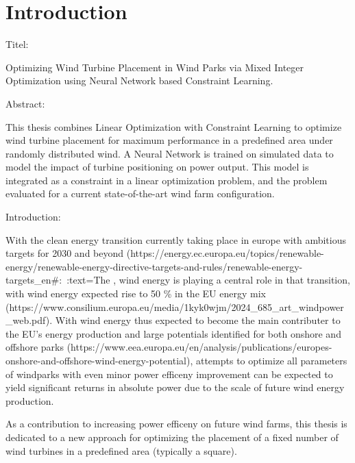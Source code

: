
\chapter{Introduction}\label{chapter:introduction}

Titel:

Optimizing Wind Turbine Placement in Wind Parks via Mixed Integer Optimization using Neural Network based Constraint Learning.


Abstract: 

This thesis combines Linear Optimization with Constraint Learning to optimize wind turbine placement for maximum performance in a predefined area under randomly distributed wind. A Neural Network is trained on simulated data to model the impact of turbine positioning on power output. This model is integrated as a constraint in a linear optimization problem, and the problem evaluated for a current state-of-the-art wind farm configuration.


Introduction: 

With the clean energy transition currently taking place in europe with ambitious targets for 2030 and beyond (https://energy.ec.europa.eu/topics/renewable-energy/renewable-energy-directive-targets-and-rules/renewable-energy-targets_en#:~:text=The%
, wind energy is playing a central role in that transition, with wind energy expected rise to 50 \% in the EU energy mix (https://www.consilium.europa.eu/media/1kyk0wjm/2024_685_art_windpower_web.pdf). With wind energy thus expected to become the main contributer to the EU's energy production and large potentials identified for both onshore and offshore parks (https://www.eea.europa.eu/en/analysis/publications/europes-onshore-and-offshore-wind-energy-potential), attempts to optimize all parameters of windparks with even minor power efficeny improvement can be expected to yield significant returns in absolute power due to the scale of future wind energy production. 

As a contribution to increasing power efficeny on future wind farms, this thesis is dedicated to a new approach for optimizing the placement of a fixed number of wind turbines in a predefined area (typically a square).

